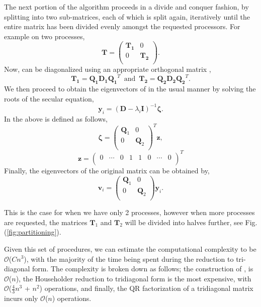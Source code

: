 \documentclass[twocolumn]{article}
\begin{document}
The next portion of the algorithm proceeds in a divide and conquer fashion, by splitting  into two sub-matrices, each of which is split again, iteratively until the entire matrix has been divided evenly amongst the requested processors. For example on two processes, 
\[
\bm{T}  = \left(
\begin{array}{cc}
\bm{T_{1}}  &  0\\
0  &  \bm{T_{2}} \\
\end{array}
\right).
\]
Now,   can be diagonalized using an appropriate orthogonal matrix ,
\begin{equation}\label{eq:Qdiag}
\bm{T_{1}}  = \bm{Q_{1}}\bm{D_{1}}\bm{Q_{1}} ^{T} \,\,\, \text{and} \,\,\, \bm{T_{2}}  = \bm{Q_{2}}\bm{D_{2}}\bm{Q_{2}} ^{T}.
\end{equation}
 We then proceed to obtain the eigenvectors of  in the usual manner by solving the roots of the secular equation,
 \begin{equation}\label{eq:secular}
\bm{y}_{i} = (\bm{D} - \lambda_{i}\bm{I})^{-1}\bm{\zeta}.
\end{equation}
In the above \bm{$\zeta$} is defined as follows,
\[
\bm{\zeta} = \left(
\begin{array}{cc}
\bm{Q}_{1}  &  0\\
0  &  \bm{Q}_{2}\\
\end{array}
\right)^{T} \textbf{z},
\]
\[
\textbf{z} = \left(
\begin{array}{cccccccc}
0  & \cdots & 0 & 1 & 1 & 0 & \cdots & 0\\
\end{array}
\right)^{T}
\]
Finally, the eigenvectors of the original matrix  can be obtained by,
 \begin{equation}\label{eq:evecs}
\textbf{v}_{i}= \left(
\begin{array}{cc}
\bm{Q}_{1}  &  0\\
0  &  \bm{Q}_{2}\\
\end{array}
\right) \bm{y}_{i}.
\end{equation}

This is the case for when we have only 2 processes, however when more processes are requested, the matrices $\textbf{T}$$_{1}$ and  $\textbf{T}$$_{2}$ will be divided into halves further, see Fig. (\ref{fig:partitioning}).

Given this set of procedures, we can estimate the computational complexity to be $\mathcal{O}$($C$$n$$^{3}$), with the majority of the time being spent during the reduction to tri-diagonal form.  The complexity is broken down as follows; the construction of \bm{$\Omega$}, is $\mathcal{O}$($n$), the Householder reduction to tridiagonal form is the most expensive\cite{Jdemmel}, with $\mathcal{O}$($\frac{4}{3}$$n$$^{3}$ + $n$$^{2}$) operations, and finally, the QR factorization of a tridiagonal matrix\cite{Ortega} incurs only $\mathcal{O}$($n$) operations.
\end{document}
